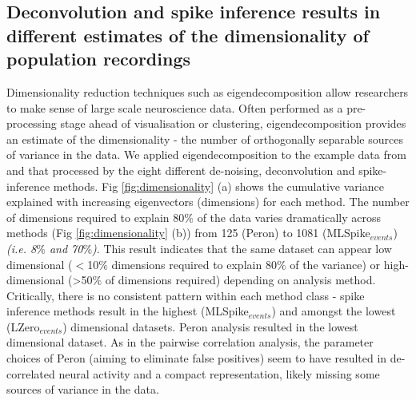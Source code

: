 \documentclass[a4paper,10pt,twocolumn]{article}
\begin{document}
\subsection{Deconvolution and spike inference results in different estimates of the dimensionality of population recordings}


Dimensionality reduction techniques such as eigendecomposition allow researchers to make sense of large scale neuroscience data. Often performed as a pre-processing stage ahead of visualisation or clustering, eigendecomposition provides an estimate of the dimensionality - the number of orthogonally separable sources of variance in the data. We applied eigendecomposition to the example data from \citealt{Peron2015-kd} and that processed by the eight different de-noising, deconvolution and spike-inference methods. Fig \ref{fig:dimensionality} (a) shows the cumulative variance explained with increasing eigenvectors (dimensions) for each method. The number of dimensions required to explain 80$\%$ of the data varies dramatically across methods (Fig \ref{fig:dimensionality} (b)) from 125 (Peron) to 1081 (MLSpike$_{events}$) \emph{(i.e. 8$\%$ and 70$\%$)}. This result indicates that the same dataset can appear low dimensional ($<$10$\%$ dimensions required to explain 80$\%$ of the variance) or high-dimensional (>50$\%$ of dimensions required) depending on analysis method. Critically, there is no consistent pattern within each method class - spike inference methods result in the highest (MLSpike$_{events}$) and amongst the lowest (LZero$_{events}$) dimensional datasets. Peron analysis resulted in the lowest dimensional dataset. As in the pairwise correlation analysis, the parameter choices of Peron (aiming to eliminate false positives) seem to have resulted in de-correlated neural activity and a compact representation, likely missing some sources of variance in the data.
\end{document}
